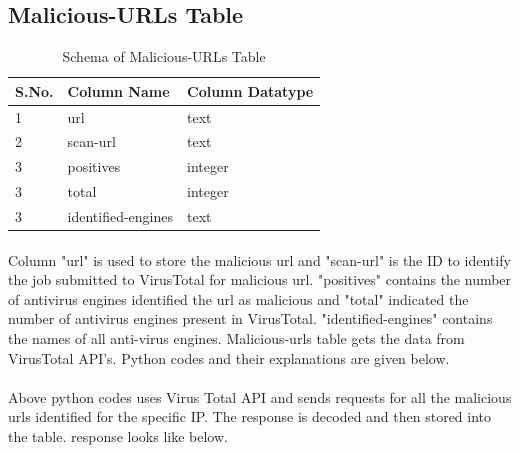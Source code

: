 \documentclass{report}
\begin{document}
\subsection{Malicious-URLs Table}

\begin{table}[H]
\begin{tabular}{ |p{2cm}|p{5cm}|p{5cm}|  }
 \hline
 \textbf{S.No.} & \textbf{Column Name} & \textbf{Column Datatype}\\
 \hline
 \hline
 1 & url & text \\
 \hline
2 & scan-url & text \\
\hline
3 & positives & integer \\
\hline
3 & total & integer \\
\hline
3 & identified-engines & text \\
\hline
\end{tabular}
 \caption{Schema of Malicious-URLs Table}
\end{table}

\paragraph{}
Column "url" is used to store the malicious url and "scan-url" is the ID to identify the job submitted to VirusTotal for malicious url. "positives" contains the number of antivirus engines identified the url as malicious and   "total" indicated the number of antivirus engines present in VirusTotal. "identified-engines" contains the names of all anti-virus engines. Malicious-urls table gets the data from VirusTotal API's. Python codes and their explanations are given below.

 


 


 


 



\paragraph{}
Above python codes uses Virus Total API and sends requests for all the malicious urls identified for the specific IP. The response is decoded and then stored into the table. response looks like below.
\end{document}

